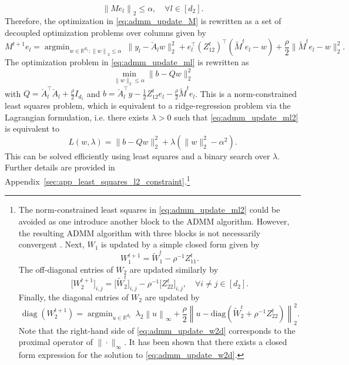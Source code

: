\documentclass[11pt]{article}
\newcommand{\R}{\mathbb{R}}
\newcommand{\norm}[1]{\left \|#1 \right \|}
\begin{document}
\[
\norm{M e_l}_2 \leq \alpha, \quad \forall l \in [d_2].
\]
Therefore, the optimization in \eqref{eq:admm_update_M} is rewritten as a set of decoupled optimization problems over columns given by
\begin{equation}
\label{eq:admm_update_ml}
M^{t+1} e_l = \mathop{\mathrm{argmin}}_{w \in \mathbb{R}^{d_1} : \norm{w}_2 \leq \alpha} \ \|y_l - \breve{A}_l w\|_2^2  + e_l^\top (Z_{12}^{t})^\top (\widetilde{M}^{t} e_l - w) +\frac{\rho}{2} \|\widetilde{M}^{t} e_l - w\|_2^2.
\end{equation}
The optimization problem in \eqref{eq:admm_update_ml} is rewritten as
\begin{equation}
\label{eq:admm_update_ml2}
\min_{\|w\|_2 \leq \alpha} \|b - Q w\|_2^2
\end{equation}
with $Q = \breve{A}_l^\top \breve{A}_l + \frac{\rho}{2} I_{d_1}$ and $b = \breve{A}_l^\top y - \frac{1}{2} Z_{12}^t e_l - \frac{\rho}{2} \widetilde{M}^t e_l$. 
This is a norm-constrained least squares problem, which is equivalent to a ridge-regression problem via the Lagrangian formulation, i.e. there exists $\lambda > 0$ such that \eqref{eq:admm_update_ml2} is equivalent to
\[
L(w,\lambda) = \|b - Qw\|_2^2 + \lambda (\|w\|_2^2 - \alpha^2).
\]
This can be solved efficiently using least squares and a binary search over $\lambda$. Further details are provided in Appendix~\ref{sec:app_least_squares_l2_constraint}.\footnote{The norm-constrained least squares in \eqref{eq:admm_update_ml2} could be avoided as one introduce another block to the ADMM algorithm. However, the resulting ADMM algorithm with three blocks is not necessarily convergent \citep{chen2016direct}.
Next, $W_1$ is updated by a simple closed form given by 
\[
W_{1}^{t+1} = \widetilde{W}_1^{t} - \rho^{-1} Z_{11}^{t}.
\]
The off-diagonal entries of $W_2$ are updated similarly by
\[
\big[ W_{2}^{t+1} \big]_{i,j} = \big[ \widetilde{W}_{2}^{t} \big]_{i,j} - \rho^{-1} \big[ Z_{22}^{t} \big]_{i,j}, \quad \forall i \neq j \in [d_2].
\]
Finally, the diagonal entries of $W_2$ are updated by
\begin{equation}
\label{eq:admm_update_w2d}
\mathop{\text{diag}}(W_{2}^{t+1}) = \mathop{\mathrm{argmin}}_{u \in \R^{d_2}} \ \lambda_2 \norm{u}_\infty + \frac{\rho}{2} \norm{u - \mathrm{diag}(\widetilde{W}_2^t + \rho^{-1} Z_{22}^t)}_2^2.
\end{equation}
Note that the right-hand side of \eqref{eq:admm_update_w2d} corresponds to the proximal operator of $\| \cdot \|_\infty$. It has been shown \citep{fang2018max} that there exists a closed form expression for the solution to \eqref{eq:admm_update_w2d}.} \\
\end{document}
